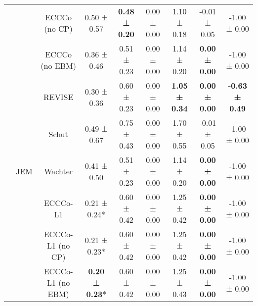 \begin{longtable}[t]{ccccccccc}
 &  & ECCCo (no CP) & 0.50 ± 0.57\hphantom{*}\hphantom{*} & \textbf{0.48 ± 0.20}\hphantom{*}\hphantom{*} & 0.00 ± 0.00\hphantom{*}\hphantom{*} & 1.10 ± 0.18\hphantom{*}\hphantom{*} & -0.01 ± 0.05\hphantom{*}\hphantom{*} & -1.00 ± 0.00\hphantom{*}\hphantom{*}\\

 &  & ECCCo (no EBM) & 0.36 ± 0.46\hphantom{*}\hphantom{*} & 0.51 ± 0.23\hphantom{*}\hphantom{*} & 0.00 ± 0.00\hphantom{*}\hphantom{*} & 1.14 ± 0.20\hphantom{*}\hphantom{*} & \textbf{0.00 ± 0.00}\hphantom{*}\hphantom{*} & -1.00 ± 0.00\hphantom{*}\hphantom{*}\\

 &  & REVISE & 0.30 ± 0.36\hphantom{*}\hphantom{*} & 0.60 ± 0.23\hphantom{*}\hphantom{*} & 0.00 ± 0.00\hphantom{*}\hphantom{*} & \textbf{1.05 ± 0.34}\hphantom{*}\hphantom{*} & \textbf{0.00 ± 0.00}\hphantom{*}\hphantom{*} & \textbf{-0.63 ± 0.49}\hphantom{*}\hphantom{*}\\

 &  & Schut & 0.49 ± 0.67\hphantom{*}\hphantom{*} & 0.75 ± 0.43\hphantom{*}\hphantom{*} & 0.00 ± 0.00\hphantom{*}\hphantom{*} & 1.70 ± 0.55\hphantom{*}\hphantom{*} & -0.01 ± 0.05\hphantom{*}\hphantom{*} & -1.00 ± 0.00\hphantom{*}\hphantom{*}\\

 & \multirow[t]{-9}{*}{\centering\arraybackslash JEM} & Wachter & 0.41 ± 0.50\hphantom{*}\hphantom{*} & 0.51 ± 0.23\hphantom{*}\hphantom{*} & 0.00 ± 0.00\hphantom{*}\hphantom{*} & 1.14 ± 0.20\hphantom{*}\hphantom{*} & \textbf{0.00 ± 0.00}\hphantom{*}\hphantom{*} & -1.00 ± 0.00\hphantom{*}\hphantom{*}\\
\cmidrule{2-9}
 &  & ECCCo-L1 & 0.21 ± 0.24*\hphantom{*} & 0.60 ± 0.42\hphantom{*}\hphantom{*} & 0.00 ± 0.00\hphantom{*}\hphantom{*} & 1.25 ± 0.42\hphantom{*}\hphantom{*} & \textbf{0.00 ± 0.00}\hphantom{*}\hphantom{*} & -1.00 ± 0.00\hphantom{*}\hphantom{*}\\

 &  & ECCCo-L1 (no CP) & 0.21 ± 0.23*\hphantom{*} & 0.60 ± 0.42\hphantom{*}\hphantom{*} & 0.00 ± 0.00\hphantom{*}\hphantom{*} & 1.25 ± 0.42\hphantom{*}\hphantom{*} & \textbf{0.00 ± 0.00}\hphantom{*}\hphantom{*} & -1.00 ± 0.00\hphantom{*}\hphantom{*}\\

 &  & ECCCo-L1 (no EBM) & \textbf{0.20 ± 0.23}*\hphantom{*} & 0.60 ± 0.42\hphantom{*}\hphantom{*} & 0.00 ± 0.00\hphantom{*}\hphantom{*} & 1.25 ± 0.43\hphantom{*}\hphantom{*} & \textbf{0.00 ± 0.00}\hphantom{*}\hphantom{*} & -1.00 ± 0.00\hphantom{*}\hphantom{*}\\


\end{longtable}
